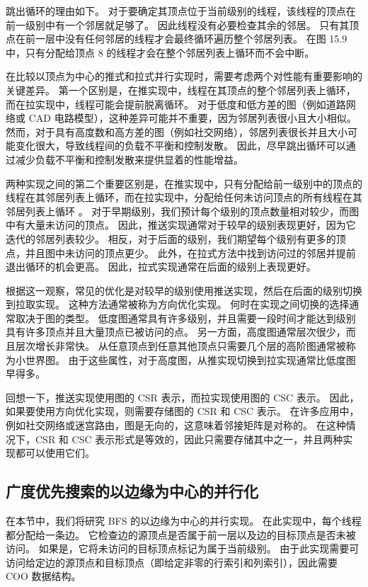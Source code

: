 跳出循环的理由如下。 对于要确定其顶点位于当前级别的线程，该线程的顶点在前一级别中有一个邻居就足够了。 因此线程没有必要检查其余的邻居。 只有其顶点在前一层中没有任何邻居的线程才会最终循环遍历整个邻居列表。 在图 15.9 中，只有分配给顶点 8 的线程才会在整个邻居列表上循环而不会中断。

在比较以顶点为中心的推式和拉式并行实现时，需要考虑两个对性能有重要影响的关键差异。 第一个区别是，在推实现中，线程在其顶点的整个邻居列表上循环，而在拉实现中，线程可能会提前脱离循环。 对于低度和低方差的图（例如道路网络或 CAD 电路模型），这种差异可能并不重要，因为邻居列表很小且大小相似。 然而，对于具有高度数和高方差的图（例如社交网络），邻居列表很长并且大小可能变化很大，导致线程间的负载不平衡和控制发散。 因此，尽早跳出循环可以通过减少负载不平衡和控制发散来提供显着的性能增益。

两种实现之间的第二个重要区别是，在推实现中，只有分配给前一级别中的顶点的线程在其邻居列表上循环，而在拉实现中，分配给任何未访问顶点的所有线程在其邻居列表上循环 。 对于早期级别，我们预计每个级别的顶点数量相对较少，而图中有大量未访问的顶点。 因此，推送实现通常对于较早的级别表现更好，因为它迭代的邻居列表较少。 相反，对于后面的级别，我们期望每个级别有更多的顶点，并且图中未访问的顶点更少。 此外，在拉式方法中找到访问过的邻居并提前退出循环的机会更高。 因此，拉式实现通常在后面的级别上表现更好。

根据这一观察，常见的优化是对较早的级别使用推送实现，然后在后面的级别切换到拉取实现。 这种方法通常被称为方向优化实现。 何时在实现之间切换的选择通常取决于图的类型。 低度图通常具有许多级别，并且需要一段时间才能达到级别具有许多顶点并且大量顶点已被访问的点。 另一方面，高度图通常层次很少，而且层次增长非常快。 从任意顶点到任意其他顶点只需要几个层的高阶图通常被称为小世界图。 由于这些属性，对于高度图，从推实现切换到拉实现通常比低度图早得多。

回想一下，推送实现使用图的 CSR 表示，而拉实现使用图的 CSC 表示。 因此，如果要使用方向优化实现，则需要存储图的 CSR 和 CSC 表示。 在许多应用中，例如社交网络或迷宫路由，图是无向的，这意味着邻接矩阵是对称的。 在这种情况下，CSR 和 CSC 表示形式是等效的，因此只需要存储其中之一，并且两种实现都可以使用它们。

\subsection{广度优先搜索的以边缘为中心的并行化}
在本节中，我们将研究 BFS 的以边缘为中心的并行实现。 在此实现中，每个线程都分配给一条边。 它检查边的源顶点是否属于前一层以及边的目标顶点是否未被访问。 如果是，它将未访问的目标顶点标记为属于当前级别。 由于此实现需要可访问给定边的源顶点和目标顶点（即给定非零的行索引和列索引），因此需要 COO 数据结构。

